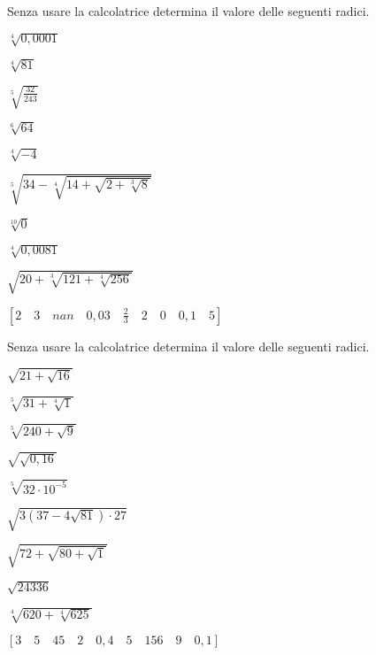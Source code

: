 \begin{esercizio}
 \label{ese:2.08}
Senza usare la calcolatrice determina il valore delle seguenti radici.
 \begin{multicols}{3}
 \begin{enumeratea}
 \item $\sqrt[4]{0,0001}$
 \item $\sqrt[4]{81}$
 \item $\sqrt[5]{\frac{32}{243}}$
 \item $\sqrt[6]{64}$
 \item $\sqrt[4]{-4}$
 \item $\sqrt[5]{34-\sqrt[4]{14+\sqrt{2+\sqrt[3]8}}}$
 \item $\sqrt[10]0$
 \item $\sqrt[4]{0,0081}$
 \item $\sqrt{20+\sqrt[3]{121+\sqrt[4]{256}}}$
 \end{enumeratea}
 \end{multicols}
\begin{flushright}
\vspace*{-8pt}
$[2 \quad 3 \quad nan \quad 0,03 \quad \frac{2}{3} \quad 2 \quad 0 
\quad 0,1 \quad 5]$
\end{flushright}
\end{esercizio}

\begin{esercizio}[\Ast]
\label{ese:2.09}
Senza usare la calcolatrice determina il valore delle seguenti radici.
 \begin{multicols}{3}
 \begin{enumeratea}
 \item $\sqrt{21+\sqrt{16}}$
 \item $\sqrt[5]{31+\sqrt[4]1}$
 \item $\sqrt[5]{240+\sqrt 9}$
 \item $\sqrt{\sqrt{0,16}}$
 \item $\sqrt[5]{32\cdot 10^{-5}}$
 \item $\sqrt{3 (37-4\sqrt{81})\cdot 27}$
 \item $\sqrt{72+\sqrt{80+\sqrt 1}}$
 \item $\sqrt{24336}$
 \item $\sqrt[4]{620+\sqrt[4]{625}}$
 \end{enumeratea}
 \end{multicols}
\begin{flushright}
\vspace*{-8pt}
$[3 \quad 5 \quad 45 \quad 2 \quad 0,4 \quad 5 \quad 156 \quad 9 \quad 0,1]$
\end{flushright}
\end{esercizio}

